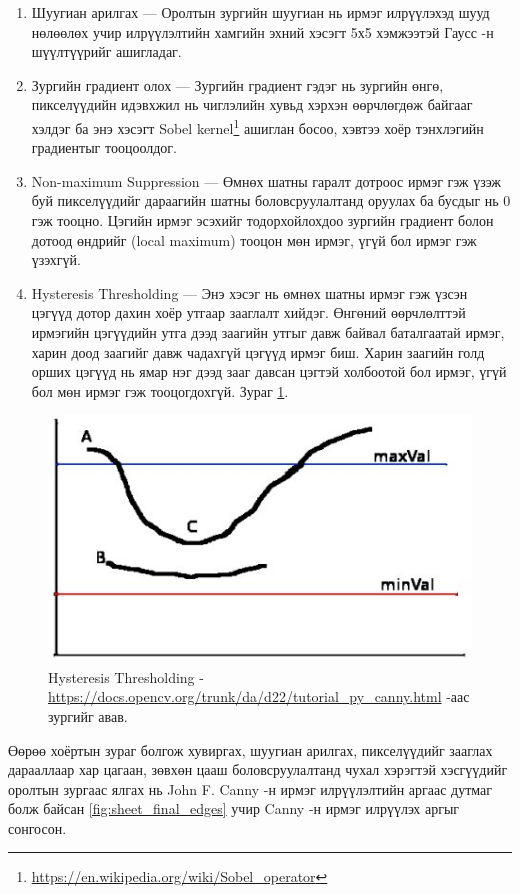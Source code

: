 \begin{enumerate}
	\item Шуугиан арилгах --- Оролтын зургийн шуугиан нь ирмэг илрүүлэхэд шууд нөлөөлөх учир илрүүлэлтийн хамгийн эхний хэсэгт 5х5 хэмжээтэй Гаусс -н шүүлтүүрийг ашигладаг.
	\item Зургийн градиент олох --- Зургийн градиент гэдэг нь зургийн өнгө, пикселүүдийн идэвхжил нь чиглэлийн хувьд хэрхэн өөрчлөгдөж байгааг хэлдэг ба энэ хэсэгт Sobel kernel\footnote{\url{https://en.wikipedia.org/wiki/Sobel_operator}} ашиглан босоо, хэвтээ хоёр тэнхлэгийн градиентыг тооцоолдог.
	\item Non-maximum Suppression --- Өмнөх шатны гаралт дотроос ирмэг гэж үзэж буй пикселүүдийг дараагийн шатны боловсруулалтанд оруулах ба бусдыг нь 0 гэж тооцно. Цэгийн ирмэг эсэхийг тодорхойлохдоо зургийн градиент болон дотоод өндрийг (local maximum) тооцон мөн ирмэг, үгүй бол ирмэг гэж үзэхгүй.
	\item Hysteresis Thresholding --- Энэ хэсэг нь өмнөх шатны ирмэг гэж үзсэн цэгүүд дотор дахин хоёр утгаар зааглалт хийдэг. Өнгөний өөрчлөлттэй ирмэгийн цэгүүдийн утга дээд заагийн утгыг давж байвал баталгаатай ирмэг, харин доод заагийг давж чадахгүй цэгүүд ирмэг биш. Харин заагийн голд орших цэгүүд нь ямар нэг дээд зааг давсан цэгтэй холбоотой бол ирмэг, үгүй бол мөн ирмэг гэж тооцогдохгүй. Зураг \ref{fig:hysteresis}.
\end{enumerate}

\begin{figure}[H]
	\centering
	\includegraphics[width=0.6\linewidth]{images/hysteresis}
	\caption{Hysteresis Thresholding - \url{https://docs.opencv.org/trunk/da/d22/tutorial_py_canny.html} -аас зургийг авав.}
	\label{fig:hysteresis}
\end{figure}

Өөрөө хоёртын зураг болгож хувиргах, шуугиан арилгах, пикселүүдийг зааглах дарааллаар хар цагаан, зөвхөн цааш боловсруулалтанд чухал хэрэгтэй хэсгүүдийг оролтын зургаас ялгах нь John F. Canny -н ирмэг илрүүлэлтийн аргаас дутмаг болж байсан \ref{fig:sheet_final_edges} учир Canny -н ирмэг илрүүлэх аргыг сонгосон.

